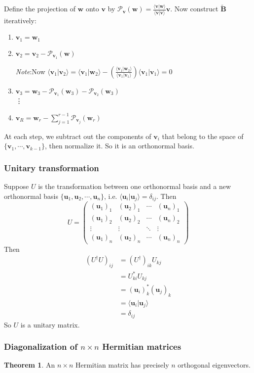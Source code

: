 \documentclass[a4paper]{article}
\theoremstyle{definition}
\newtheorem*{thm}{Theorem}
\newcommand{\mb}[1]{\mathbf{#1}}
\newcommand{\note}{\noindent \emph{Note}:\;}
\newcommand{\bra}{\langle}
\newcommand{\ket}{\rangle}
\begin{document}
Define the projection of $\mb{w}$ onto $\mb{v}$ by $\mathcal{P}_\mb{v}(\mb{w}) = \frac{\bra \mb{v}|\mb{w}\ket}{\bra \mb{v}|\mb{v}\ket} \mb{v}$. Now construct $\tilde{\mb{B}}$ iteratively:
\begin{enumerate}
\item $\mb{v}_1 = \mb{w}_1$
\item $\mb{v}_2 = \mb{v}_2 - \mathcal{P}_{\mb{v}_1}(\mb{w})$

\note Now $\bra \mb{v}_1|\mb{v}_2\ket = \bra \mb{v}_1|\mb{w}_2\ket - \left(\frac{\bra \mb{v}_1|\mb{w}_2\ket}{\bra \mb{v}_1 | \mb{v}_1\ket}\right) \bra \mb{v}_1|\mb{v}_1\ket = 0$
\item $\mb{v}_3 = \mb{w}_3 - \mathcal{P}_{\mb{v}_1}(\mb{w}_3) - \mathcal{P}_{\mb{v}_2}(\mb{w}_3)$\\
\vdots
\item $\displaystyle \mb{v}_R = \mb{w}_r - \sum_{j = 1}^{r - 1} \mathcal{P}_{\mb{v}_j}(\mb{w}_r)$
\end{enumerate}
At each step, we subtract out the components of $\mb{v}_i$ that belong to the space of $\{\mb{v}_1, \cdots, \mb{v}_{k - 1}\}$, then normalize it. So it is an orthonormal basis.

\subsubsection{Unitary transformation}
Suppose $U$ is the transformation between one orthonormal basis and a new orthonormal basis $\{\mb{u}_1, \mb{u}_2, \cdots, \mb{u}_n\}$, i.e. $\bra \mb{u}_i| \mb{u}_j\ket = \delta_{ij}$. Then
\[
U = 
\begin{pmatrix}
  (\mb{u}_1)_1 & (\mb{u}_2)_1 & \cdots & (\mb{u}_n)_1\\
  (\mb{u}_1)_2 & (\mb{u}_2)_2 & \cdots & (\mb{u}_n)_2\\
  \vdots & \vdots & \ddots & \vdots\\
  (\mb{u}_1)_n & (\mb{u}_2)_n & \cdots & (\mb{u}_n)_n
\end{pmatrix}
\]
Then 
\begin{align*}
  (U^\dagger U)_{ij} &= (U^\dagger)_{ik}U_{kj}\\
  &= U_{ki}^* U_{kj}\\
  &= (\mb{u}_i)^*_k(\mb{u}_j)_k\\
  &= \bra \mb{u}_i | \mb{u}_j \ket\\
  &= \delta_{ij}
\end{align*}
So $U$ is a unitary matrix.
\subsubsection{Diagonalization of \texorpdfstring{$n\times n$}{n x n} Hermitian matrices}
\begin{thm}
  An $n\times n$ Hermitian matrix has precisely $n$ orthogonal eigenvectors.
\end{thm}
\end{document}
